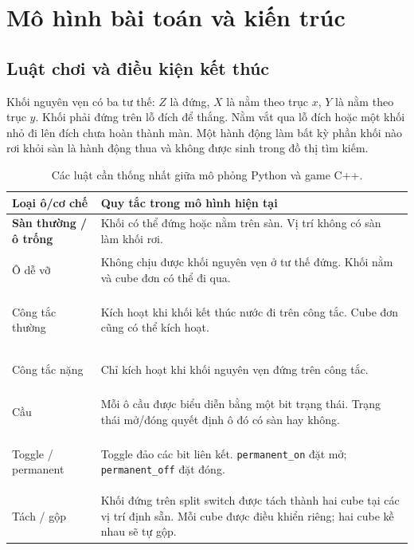 \documentclass[a4paper]{article}
\begin{document}
\section{Mô hình bài toán và kiến trúc}
\subsection{Luật chơi và điều kiện kết thúc}
Khối nguyên vẹn có ba tư thế: $Z$ là đứng, $X$ là nằm theo trục $x$, $Y$ là nằm theo trục $y$. Khối phải đứng trên lỗ đích để thắng. Nằm vắt qua lỗ đích hoặc một khối nhỏ đi lên đích chưa hoàn thành màn. Một hành động làm bất kỳ phần khối nào rơi khỏi sàn là hành động thua và không được sinh trong đồ thị tìm kiếm.

\begin{table}[H]
\centering
\small
\renewcommand{\arraystretch}{1.4}
\setlength{\tabcolsep}{8pt}

\begin{tabularx}{\textwidth}{
    |>{\raggedright\arraybackslash\bfseries}p{3.2cm}
    |>{\raggedright\arraybackslash}X|
}
\hline
\rowcolor{blue!12}
Loại ô/cơ chế &
\textbf{Quy tắc trong mô hình hiện tại} \\
\hline

Sàn thường / ô trống &
Khối có thể đứng hoặc nằm trên sàn.
Vị trí không có sàn làm khối rơi. \\
\hline

Ô dễ vỡ &
Không chịu được khối nguyên vẹn ở tư thế đứng.
Khối nằm và cube đơn có thể đi qua. \\
\hline

Công tắc thường &
Kích hoạt khi khối kết thúc nước đi trên công tắc.
Cube đơn cũng có thể kích hoạt. \\
\hline

Công tắc nặng &
Chỉ kích hoạt khi khối nguyên vẹn đứng trên công tắc. \\
\hline

Cầu &
Mỗi ô cầu được biểu diễn bằng một bit trạng thái.
Trạng thái mở/đóng quyết định ô đó có sàn hay không. \\
\hline

Toggle / permanent &
Toggle đảo các bit liên kết.
\texttt{permanent\_on} đặt mở;
\texttt{permanent\_off} đặt đóng. \\
\hline

Tách / gộp &
Khối đứng trên split switch được tách thành hai cube
tại các vị trí định sẵn.
Mỗi cube được điều khiển riêng;
hai cube kề nhau sẽ tự gộp. \\
\hline
\end{tabularx}

\caption{Các luật cần thống nhất giữa mô phỏng Python và game C++.}
\label{tab:luat-choi}
\end{table}
\end{document}
